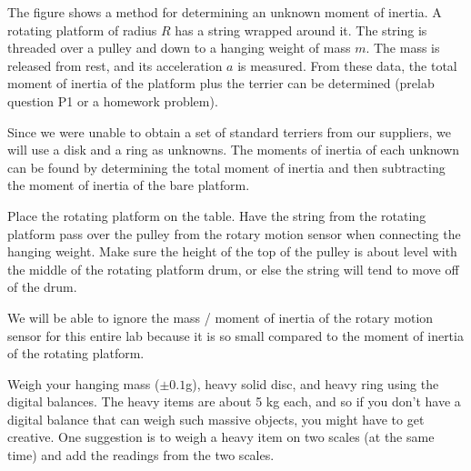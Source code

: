 \label{lab:moment-of-inertia-brian}

\apparatus
{}


\introduction

The figure shows a method for determining an unknown moment of inertia.
A rotating platform of radius $R$ has
a string wrapped around it. The string is threaded over a pulley and
down to a hanging weight of mass $m$. The mass is released from rest,
and its acceleration $a$ is measured. From these data, the total moment
of inertia of the platform plus the terrier can be determined (prelab question
P1 or a homework problem).


Since we were unable to obtain a set of standard terriers from our
suppliers, we will use a disk and a ring as unknowns. The moments of
inertia of each unknown can be found by determining the total moment
of inertia and then subtracting the moment of inertia of the bare platform.


\setup

Place the rotating platform on the table. Have the string from the
rotating platform pass over the pulley from the rotary motion sensor
when connecting the hanging weight. Make sure the height of the top of
the pulley is about level with the middle of the rotating platform
drum, or else the string will tend to move off of the drum. 

We will be able to ignore the mass / moment of inertia of the rotary
motion sensor for this entire lab because it is so small compared to
the moment of inertia of the rotating platform. 

Weigh your hanging mass ($\pm0.1$g), heavy solid disc, and heavy ring
using the digital balances. The heavy items are about 5 kg each, and
so if you don't have a digital balance that can weigh such massive
objects, you might have to get creative. One suggestion is to weigh a
heavy item on two scales (at the same time) and add the readings from
the two scales. 

\observations


